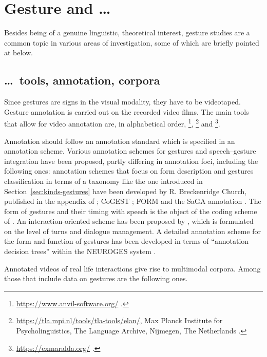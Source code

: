 \documentclass[output=paper
 	        ,biblatex
                ,babelshorthands
                ,newtxmath
                ,draftmode
                ,colorlinks, citecolor=brown
]{langscibook}
\begin{document}
\section{Gesture and \ldots}
\label{sec:gesture-and}

Besides being of a genuine linguistic, theoretical interest, gesture studies are a common topic in various areas of investigation, some of which are briefly pointed at below. 


\subsection{\ldots\ tools, annotation, corpora}
\label{sec:tools-annotation-corpora}

Since gestures are signs in the visual modality, they have to be videotaped.
%
Gesture annotation is carried out on the recorded video films.
%
The main tools that allow for video annotation are, in alphabetical order, \footnote{%
\url{https://www.anvil-software.org/} \citep{Kipp:2014}.
}, \footnote{%
\url{https://tla.mpi.nl/tools/tla-tools/elan/}, Max Planck Institute for Psycholinguistics, The
Language Archive, Nijmegen, The Netherlands \citep{Sloetjes:Wittenburg:2008}.}
and \footnote{%
\url{https://exmaralda.org/} \citep{Schmidt:2012}.
}.

Annotation should follow an annotation standard which is specified in an annotation scheme.
%
Various annotation schemes for gestures and speech--gesture integration have been proposed, partly differing in annotation foci, including the following ones:
%
annotation schemes that focus on form description and gestures classification in terms of a taxonomy like the one introduced in Section~\ref{sec:kinds-gestures} have been developed by R. Breckenridge Church, published in the appendix of \citet{McNeill:1992}; CoGEST \citep{Gibbon:et:al:2003}; FORM \citep{Martell:Osborn:Friedman:Howard:2002} and the SaGA annotation \citep{Luecking:Bergmann:Hahn:Kopp:Rieser:2013}.
%
The form of gestures and their timing with speech is the object of the coding scheme of \citet{Kipp:Neff:Albrecht:2007}.
%
An interaction-oriented scheme has been proposed by \citet{Allwood:et:al:2007}, which is formulated on the level of turns and dialogue management.
%
A detailed annotation scheme for the form and function of gestures has been developed in terms of \enquote{annotation decision trees} within the NEUROGES system \citep{Lausberg:Sloetjes:2009}.


Annotated videos of real life interactions give rise to multimodal corpora. 
%
Among those that include data on gestures are the following ones.
\end{document}
